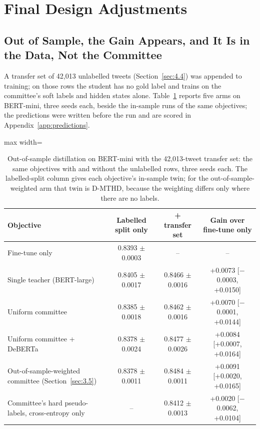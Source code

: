 \section{Final Design Adjustments}
\label{sec:5.adjust}
\subsection{Out of Sample, the Gain Appears, and It Is in the Data, Not the Committee}
\label{sec:5.7}
A transfer set of 42,013 unlabelled tweets (Section~\ref{sec:4.4}) was appended to training; on
those rows the student has no gold label and trains on the committee's soft labels and hidden states
alone. Table~\ref{tab:oos} reports five arms on BERT-mini, three seeds each, beside the in-sample
runs of the same objectives; the predictions were written before the run and are scored in
Appendix~\ref{app:predictions}.

\begin{table}[htbp]
\centering
\small
\caption[Out-of-sample distillation on BERT-mini]{Out-of-sample distillation on BERT-mini with the 42,013-tweet transfer set: the same objectives with and without the unlabelled rows, three seeds each. The labelled-split column gives each objective's in-sample twin; for the out-of-sample-weighted arm that twin is D-MTHD, because the weighting differs only where there are no labels.}
\label{tab:oos}
\begin{adjustbox}{max width=\textwidth}
\begin{tabular}{lccc}
\toprule
Objective & Labelled split only & + transfer set & Gain over fine-tune only \\
\midrule
Fine-tune only & 0.8393 $\pm$ 0.0003 & -- & -- \\
Single teacher (BERT-large) & 0.8405 $\pm$ 0.0017 & 0.8466 $\pm$ 0.0016 & +0.0073 [$-$0.0003, +0.0150] \\
Uniform committee & 0.8385 $\pm$ 0.0018 & 0.8462 $\pm$ 0.0016 & +0.0070 [$-$0.0001, +0.0144] \\
Uniform committee + DeBERTa & 0.8378 $\pm$ 0.0024 & 0.8477 $\pm$ 0.0026 & +0.0084 [+0.0007, +0.0164] \\
Out-of-sample-weighted committee (Section~\ref{sec:3.5}) & 0.8378 $\pm$ 0.0011 & 0.8484 $\pm$ 0.0011 & +0.0091 [+0.0020, +0.0165] \\
Committee's hard pseudo-labels, cross-entropy only & -- & 0.8412 $\pm$ 0.0013 & +0.0020 [$-$0.0062, +0.0104] \\
\bottomrule
\end{tabular}
\end{adjustbox}
\end{table}

